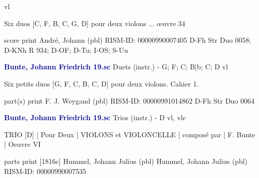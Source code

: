 \documentclass[twocolumn]{book}
\begin{document}
 vl
\newline \begin{itshape}Six duos [C, F, B, C, G, D] pour deux violons ... œuvre 34\end{itshape} 
\newline \textcolor{darkblue}{}  score
\newline print
\newline André, Johann  (pbl)
\newline RISM-ID: 00000990007405
\newline D-Fh  Str Duo 0058; D-KNh  R 934; D-OF; D-Tu; I-OS; S-Uu
\newline \par \vspace{7pt} \textcolor{darkblue}{\textbf{Bunte, Johann Friedrich  19.sc}}
\newline Duets (instr.) - G; F; C; B|b; C; D
 vl
\newline \begin{itshape}Six petits duos [G, F, C, B, C, D] pour deux violons. Cahier 1.\end{itshape} 
\newline \textcolor{darkblue}{}  part(s)
\newline print
\newline F. J. Weygand  (pbl)
\newline RISM-ID: 00000991014862
\newline D-Fh  Str Duo 0064
\newline \par \vspace{7pt} \textcolor{darkblue}{\textbf{Bunte, Johann Friedrich  19.sc}}
\newline Trios (instr.) - D
 vl, vlc
\newline \begin{itshape}TRIO [D] | Pour Deux | VIOLONS et VIOLONCELLE | composé par | F. Bunte | Oeuvre VI\end{itshape} 
\newline \textcolor{darkblue}{}  parts
\newline print  [1816c]
\newline Hummel, Johann Julius  (pbl)
\newline Hummel, Johann Julius  (pbl)
\newline RISM-ID: 00000990007535
\end{document}
